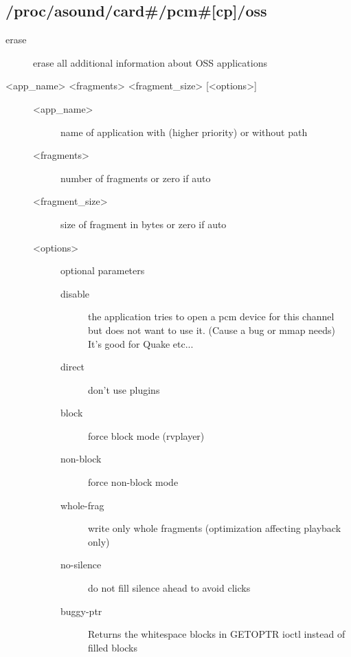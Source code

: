 \documentclass[a4paper,8pt,english]{sphinxmanual}
\begin{document}
\subsection{/proc/asound/card\#/pcm\#{[}cp{]}/oss}
\label{sound/alsa-configuration:proc-asound-card-pcm-cp-oss}\begin{description}
\item[{erase}] \leavevmode
erase all additional information about OSS applications

\item[{\textless{}app\_name\textgreater{} \textless{}fragments\textgreater{} \textless{}fragment\_size\textgreater{} {[}\textless{}options\textgreater{}{]}}] \leavevmode\begin{description}
\item[{\textless{}app\_name\textgreater{}}] \leavevmode
name of application with (higher priority) or without path

\item[{\textless{}fragments\textgreater{}}] \leavevmode
number of fragments or zero if auto

\item[{\textless{}fragment\_size\textgreater{}}] \leavevmode
size of fragment in bytes or zero if auto

\item[{\textless{}options\textgreater{}}] \leavevmode
optional parameters
\begin{description}
\item[{disable}] \leavevmode
the application tries to open a pcm device for
this channel but does not want to use it.
(Cause a bug or mmap needs)
It's good for Quake etc...

\item[{direct}] \leavevmode
don't use plugins

\item[{block}] \leavevmode
force block mode (rvplayer)

\item[{non-block}] \leavevmode
force non-block mode

\item[{whole-frag}] \leavevmode
write only whole fragments (optimization affecting
playback only)

\item[{no-silence}] \leavevmode
do not fill silence ahead to avoid clicks

\item[{buggy-ptr}] \leavevmode
Returns the whitespace blocks in GETOPTR ioctl
instead of filled blocks

\end{description}

\end{description}

\end{description}
\end{document}
